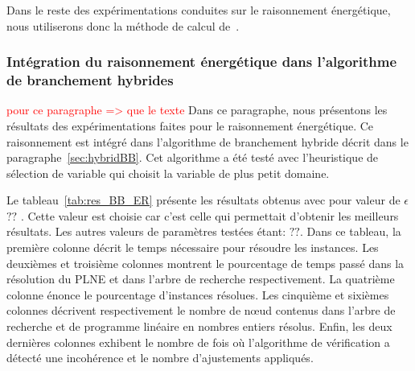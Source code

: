 Dans le reste des expérimentations conduites sur le raisonnement
énergétique, nous utiliserons donc la méthode de calcul de~\cite{DP}. 

\subsubsection{Intégration du raisonnement énergétique dans
  l'algorithme de branchement hybrides}
\textcolor{red}{\LARGE pour ce paragraphe => que le texte}
Dans ce paragraphe, nous présentons les résultats des expérimentations
faites pour le raisonnement énergétique. Ce raisonnement est intégré
dans l'algorithme de branchement hybride décrit dans le
paragraphe~\ref{sec:hybridBB}. Cet algorithme a été testé avec
l'heuristique de sélection de variable qui choisit la variable de plus
petit domaine.

Le tableau~\ref{tab:res_BB_ER} présente les résultats obtenus avec 
pour valeur de $\epsilon$ $??$ . Cette valeur est choisie car c'est celle
qui permettait d'obtenir les meilleurs résultats. Les autres valeurs
de paramètres testées étant: $??$. Dans ce tableau, la première
colonne décrit le temps nécessaire pour résoudre les instances. Les
deuxièmes et troisième colonnes montrent le pourcentage de temps passé
dans la résolution du PLNE et dans l'arbre de recherche
respectivement. La quatrième colonne énonce le pourcentage d'instances
résolues. Les cinquième et sixièmes colonnes décrivent respectivement
le nombre de n\oe ud contenus dans l'arbre de recherche et de programme
linéaire en nombres entiers résolus. Enfin, les deux dernières colonnes
exhibent le nombre de fois où l'algorithme de vérification a détecté
une incohérence et le nombre d'ajustements appliqués. 

